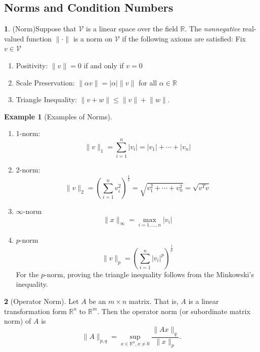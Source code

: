 \documentclass[12pt]{article}
\theoremstyle{definition}
\newtheorem{definition}{\color{NavyBlue}{\textbf{Definition}}}
\newcommand{\R}{\mathbb{R}}
\newcommand{\norm}[1]{\lVert#1\rVert}
\newtheorem{example}{\color{WildStrawberry}Example}
\theoremstyle{definition}
\begin{document}
\subsection{Norms and Condition Numbers}
\begin{definition}(Norm)\label{norm}
Suppose that $\mathcal{V}$ is a linear space over the field $\R$. The \textit{nonnegative} real-valued function $\norm{\cdot}$ is a norm on $\mathcal{V}$ if the following axioms are satisfied: Fix $v \in \mathcal{V}$
\begin{enumerate}
	\item Positivity: $\norm{v} = 0$ if and only if $v = 0$
	\item Scale Preservation: $\norm{\alpha v} = |\alpha| \norm{v}$ for all $\alpha \in \R$
	\item Triangle Inequality: $\norm{v + w} \leq \norm{v} + \norm{w}$.
\end{enumerate}
\end{definition}

\begin{example}[Examples of Norms]
\begin{enumerate}
	\item 1-norm:
	\begin{equation}
		\norm{v}_1 = \sum_{i=1}^n |v_i| = |v_1| + \cdots + |v_n|
	\end{equation}
	\item 2-norm:
	\begin{equation}
		\norm{v}_2 = \left( \sum_{i=1}^n v_i^2 \right)^{\frac{1}{2}} = \sqrt{v_1^2 + \cdots + v_n^2} = \sqrt{v^T v}
	\end{equation}
	\item $\infty$-norm
	\begin{equation}
		\norm{x}_{\infty} = \max_{i=1, \ldots, n} |v_i|
	\end{equation}
	\item $p$-norm
	\begin{equation}
		\norm{v}_p = \left( \sum_{i=1}^n |v_i|^p \right)^{\frac{1}{p}}
	\end{equation}
	For the $p$-norm, proving the triangle inequality follows from the Minkowski's inequality.
\end{enumerate}
\end{example}

\begin{definition}[Operator Norm]
Let $A$ be an $m \times n$ matrix. That is, $A$ is a linear transformation form $\R^n$ to $\R^m$. Then the operator norm (or subordinate matrix norm) of $A$ is
\begin{equation}
	\norm{A}_{p,q} = \sup_{x \in \R^n, x\neq 0} \frac{\norm{Ax}_q}{\norm{x}_p}.
\end{equation}
\end{definition}
\end{document}
